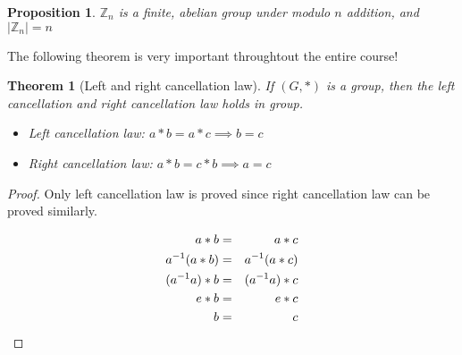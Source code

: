 \documentclass{article}
\theoremstyle{MyNonumberplain}
\theoremstyle{break}
\newtheorem*{proof}{Proof. }
\newcommand{\Z}{\mathbb{Z}}
\theoremstyle{break}
\newtheorem{theorem}{Theorem}[section]
\newtheorem{proposition}{Proposition}[section]
\theoremstyle{break}
\theoremstyle{definition}
\theoremstyle{break}
\begin{document}
\begin{thmbox}
    \begin{proposition}
        $\Z_n$ is a finite, abelian group under modulo $n$ addition, and $|\Z_n|=n$
    \end{proposition}    
\end{thmbox}

The following theorem is very important throughtout the entire course!

\begin{thmbox}
    \begin{theorem}[Left and right cancellation law]
        If $(G, \ast)$ is a group, then the left cancellation and right cancellation law holds in group.\bigskip
        \begin{itemize}
            \item Left cancellation law: $a*b=a*c\implies b=c$
            \item Right cancellation law: $a*b=c*b\implies a=c$
        \end{itemize}
    \end{theorem}
    \begin{prfbox}
        \begin{proof}
            Only left cancellation law is proved since right cancellation law can be proved similarly.
    
            \begin{eqnarray}
                a \ast b & = & a \ast c\nonumber\\
                a^{- 1} (a \ast b) & = & a^{- 1} (a \ast c)\nonumber\\
                (a^{- 1} a) \ast b & = & (a^{- 1} a) \ast c \hspace*{\fill}
                \nonumber\\
                e \ast b & = & e \ast c \hspace*{\fill} \nonumber\\
                b & = & c \hspace*{\fill}  \nonumber
              \end{eqnarray}
        \end{proof}
    \end{prfbox}
    
\end{thmbox}
\end{document}
